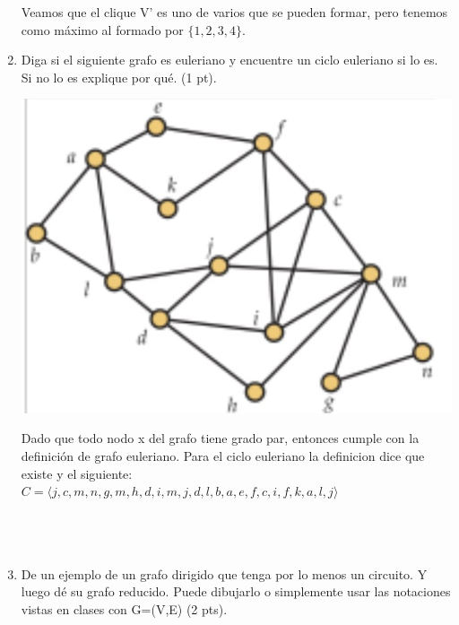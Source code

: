 \documentclass[a4paper,12pt]{article}
\begin{document}
\begin{enumerate}
Veamos que el clique V' es uno de varios que se pueden formar, pero tenemos como máximo al formado por $\{1,2,3,4\}$.

\item Diga si el siguiente grafo es euleriano y encuentre un ciclo euleriano si lo es. Si no lo es explique por qué. (1 pt).

\begin{center}
\par \includegraphics[scale=0.8]{im1} \par
\end{center} 

\begin{flushleft}
Dado que todo nodo x del grafo tiene grado par, entonces cumple con la definición de grafo euleriano. Para el ciclo euleriano la definicion dice que existe y el siguiente: 
$C = \langle j, c, m, n, g, m, h, d, i, m, j, d, l, b, a, e, f, c, i, f, k, a, l, j \rangle$
$~~$ \\
$~~$ \\
$~~$ \\
$~~$ \\
\end{flushleft}

\item De un ejemplo de un grafo dirigido que tenga por lo menos un circuito. Y luego dé su grafo reducido. Puede dibujarlo o simplemente usar las notaciones vistas en clases con G=(V,E) (2 pts).

\begin{flushleft}


\end{flushleft}
\end{enumerate}
\end{document}
